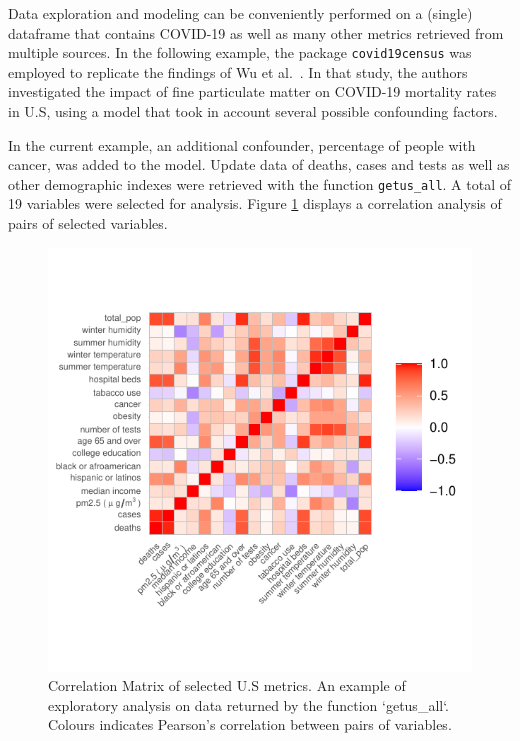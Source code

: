 \documentclass[12pt,halfline,a4paper,]{ouparticle}
\begin{document}
Data exploration and modeling can be conveniently performed on a
(single) dataframe that contains COVID-19 as well as many other metrics
retrieved from multiple sources. In the following example, the package
\texttt{covid19census} was employed to replicate the findings of Wu et
al.~\citeyearpar{wu2020m}. In that study, the authors investigated the
impact of fine particulate matter on COVID-19 mortality rates in U.S,
using a model that took in account several possible confounding factors.

In the current example, an additional confounder, percentage of people
with cancer, was added to the model. Update data of deaths, cases and
tests as well as other demographic indexes were retrieved with the
function \texttt{getus\_all}. A total of 19 variables were selected for
analysis. Figure \ref{fig:fig_corr} displays a correlation analysis of
pairs of selected variables.

\begin{figure}[p]
\includegraphics[width=1\linewidth]{draft_files/figure-latex/fig_corr-1} \caption{Correlation Matrix of selected U.S metrics. An example of exploratory analysis on data returned by the function `getus\_all`. Colours indicates Pearson's correlation between pairs of variables.}\label{fig:fig_corr}
\end{figure}
\end{document}
